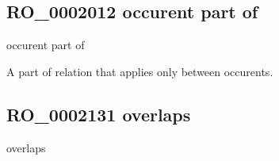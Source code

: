 \documentclass[letterpaper,10pt,english]{sphinxmanual}
\begin{document}
\subsection{RO\_0002012 \sphinxhyphen{} occurent part of}
\label{\detokenize{doc-RO_0002012:ro-0002012-occurent-part-of}}\label{\detokenize{doc-RO_0002012:index-0}}\label{\detokenize{doc-RO_0002012::doc}}
\begin{sphinxShadowBox}

\sphinxAtStartPar
occurent part of
\end{sphinxShadowBox}

\begin{sphinxShadowBox}

\sphinxAtStartPar
{\hyperref[\detokenize{doc-BFO_0000050::doc}]{}}

\sphinxAtStartPar
{}
\end{sphinxShadowBox}

\begin{sphinxShadowBox}

\sphinxAtStartPar
A part of relation that applies only between occurents.
\end{sphinxShadowBox}

\begin{sphinxShadowBox}

\sphinxAtStartPar
{}

\sphinxAtStartPar
{}
\end{sphinxShadowBox}
\begin{quote}

\ignorespaces \end{quote}


\subsection{RO\_0002131 \sphinxhyphen{} overlaps}
\label{\detokenize{doc-RO_0002131:ro-0002131-overlaps}}\label{\detokenize{doc-RO_0002131:index-0}}\label{\detokenize{doc-RO_0002131::doc}}
\begin{sphinxShadowBox}

\sphinxAtStartPar
overlaps
\end{sphinxShadowBox}
\end{document}
